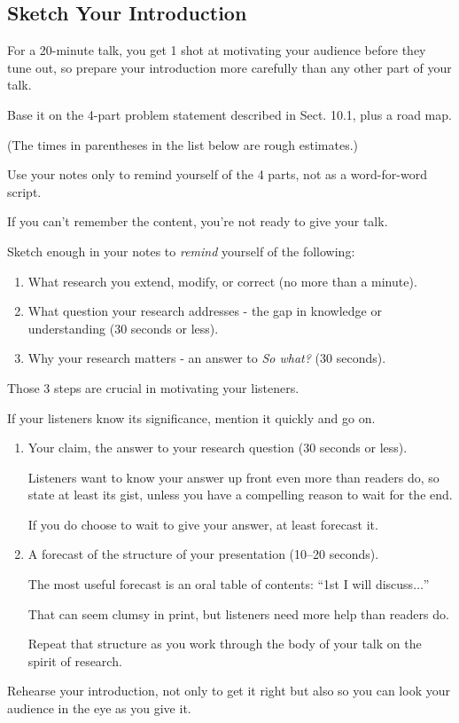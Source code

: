 \documentclass[oneside]{book}
\numberwithin{equation}{section}
\begin{document}
\subsection{Sketch Your Introduction}
For a 20-minute talk, you get 1 shot at motivating your audience before they tune out, so prepare your introduction more carefully than any other part of your talk.

Base it on the 4-part problem statement described in Sect. 10.1, plus a road map.

(The times in parentheses in the list below are rough estimates.)

%
Use your notes only to remind yourself of the 4 parts, not as a word-for-word script.

If you can't remember the content, you're not ready to give your talk.

Sketch enough in your notes to \textit{remind} yourself of the following:
\begin{enumerate}
    \item What research you extend, modify, or correct (no more than a minute).
    \item What question your research addresses - the gap in knowledge or understanding (30 seconds or less).
    \item Why your research matters - an answer to \textit{So what?} (30 seconds).
\end{enumerate}
Those 3 steps are crucial in motivating your listeners.


If your listeners know its significance, mention it quickly and go on.

\begin{enumerate}
    \item[4.] Your claim, the answer to your research question (30 seconds or less).
    
    Listeners want to know your answer up front even more than readers do, so state at least its gist, unless you have a compelling reason to wait for the end.
    
    If you do choose to wait to give your answer, at least forecast it.
    \item[5.] A forecast of the structure of your presentation (10--20 seconds).
    
    The most useful forecast is an oral table of contents: ``1st I will discuss$\ldots$''
    
    That can seem clumsy in print, but listeners need more help than readers do.
    
    Repeat that structure as you work through the body of your talk on the spirit of research.
\end{enumerate}
Rehearse your introduction, not only to get it right but also so you can look your audience in the eye as you give it.
\end{document}
